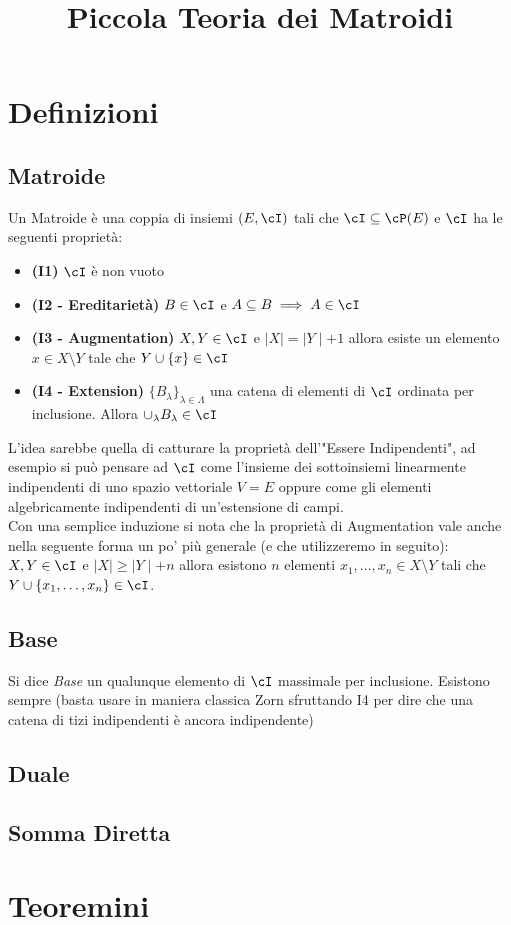 \documentclass[a4paper,NoNotes,GeneralMath]{stdmdoc}
\begin{document}
	\title{Piccola Teoria dei Matroidi}
	
	\section*{Definizioni}
	\subsection*{Matroide}
	Un Matroide è una coppia di insiemi $(E, \cI)$ tali che $\cI \subseteq \cP(E)$ e $\cI$ ha le seguenti proprietà:
		\begin{itemize}
			\item {\bf (I1)} $\cI$ è non vuoto
			\item {\bf (I2 - Ereditarietà)} $B \in \cI$ e $A \subseteq B \implies A \in \cI$
			\item {\bf (I3 - Augmentation)} $X, Y \in \cI$ e $\mid X \mid = \mid Y \mid + 1$ allora esiste un elemento $x \in X \setminus Y$ tale che $Y \cup \{ x \} \in \cI$
			\item {\bf (I4 - Extension)} $\{B_\lambda\}_{\lambda \in \Lambda}$ una catena di elementi di $\cI$ ordinata per inclusione. Allora $\cup_\lambda B_\lambda \in \cI$
		\end{itemize}
	L'idea sarebbe quella di catturare la proprietà dell'"Essere Indipendenti", ad esempio si può pensare ad $\cI$ come l'insieme dei sottoinsiemi linearmente indipendenti di uno spazio vettoriale $V = E$ oppure come gli elementi algebricamente indipendenti di un'estensione di campi. \\
	Con una semplice induzione si nota che la proprietà di Augmentation vale anche nella seguente forma un po' più generale (e che utilizzeremo in seguito): $X, Y \in \cI$ e $\mid X \mid \ge \mid Y \mid + n$ allora esistono $n$ elementi $x_1, \ldots, x_n \in X \setminus Y$ tali che $Y \cup \{x_1, \ldots, x_n\} \in \cI$.
	
	\subsection*{Base}
	Si dice {\it Base} un qualunque elemento di $\cI$ massimale per inclusione. Esistono sempre (basta usare in maniera classica Zorn sfruttando I4 per dire che una catena di tizi indipendenti è ancora indipendente)
	
	\subsection*{Duale}
	
	\subsection*{Somma Diretta}
	
	\section*{Teoremini}
	\subsection*{}
\end{document}
